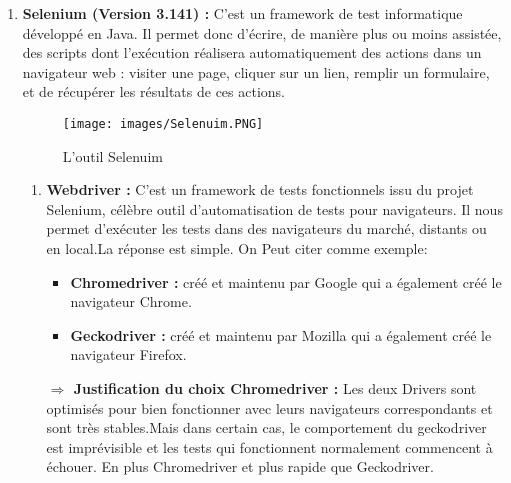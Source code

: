 \begin{enumerate}
\begin{table}[H]
\begin{tabular}[h]{|l|p{3cm}|p{3cm}|l|p{3cm}|l}
\end{tabular}
\captionsetup{justification=centering}
\caption{Tableau comparatif entre ReactJs et Angular}
\label{label-chap4 tab2}
\end{table}
Comme le montre \textbf{le tableau \ref{label-chap4 tab2}}, chaque technologie a ses propres avantages et ses inconvénients. Notre choix est fixé sur ReactJs car il est simple et facile à utiliser, grâce à sa flexibilité et son API qui permettent une utilisation facile des composants. Il est à noter également que ReactJS peut être utilisé avec le DOM virtuel pour améliorer les performances et la vitesse.

\item \textbf{Selenium  (Version 3.141) \cite{selenuim} : } C'est un framework de test informatique développé en Java. Il permet donc d'écrire, de manière plus ou moins assistée, des scripts dont l'exécution réalisera automatiquement des actions dans un navigateur web : visiter une page, cliquer sur un lien, remplir un formulaire, et de récupérer les résultats de ces actions.
\begin{figure}[tbph]
	\centering
	\texttt{[image: images/Selenuim.PNG]}
	\caption[L'outil Selenuim]{L'outil Selenuim \cite{outilselenuim}}
	\label{fig:actors}
\end{figure}
\begin{enumerate}
    \item	\textbf{Webdriver \cite{webdriver} :} C’est un framework de tests fonctionnels issu du projet Selenium, célèbre outil d'automatisation de tests pour navigateurs. Il nous permet d'exécuter les tests dans des navigateurs du marché, distants ou en local.La réponse est simple.
    On Peut citer comme exemple:
    \begin{itemize}
        \item\textbf{Chromedriver :} créé et maintenu par Google qui a également créé le navigateur Chrome.
        \item\textbf{Geckodriver :}  créé et maintenu par Mozilla qui a également créé le navigateur Firefox.
    \end{itemize}
    \textbf{$\Rightarrow$ Justification du choix Chromedriver :}
Les deux Drivers sont optimisés pour bien fonctionner avec leurs navigateurs correspondants et sont très stables.Mais dans certain cas, le comportement du geckodriver est imprévisible et les tests qui fonctionnent normalement commencent à échouer. En plus Chromedriver et plus rapide que Geckodriver.



\end{enumerate}
\end{enumerate}
